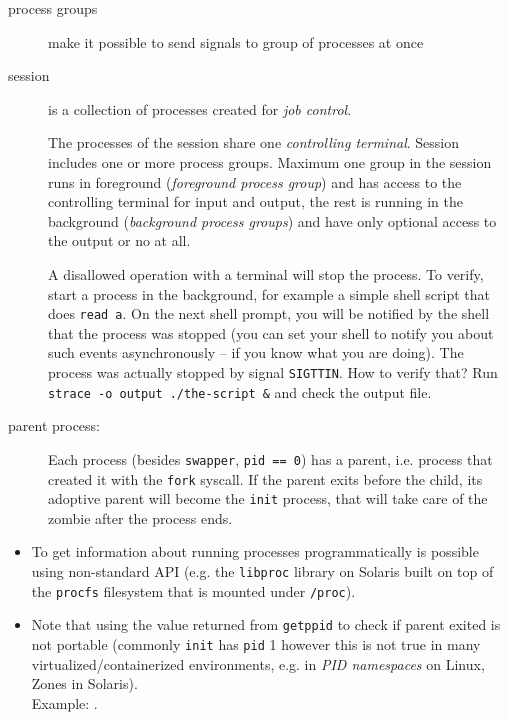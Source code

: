 \begin{description}
\item[process groups] make it possible to send signals to group of processes
at once
\item[session] is a collection of processes created for \emph{job control}.

The processes of the session share one \emph{controlling terminal}.
Session includes one or more process groups. Maximum one group in the session
runs in foreground (\emph{foreground process group}) and has access to the
controlling terminal for input and output, the rest is running in the background
(\emph{background process groups}) and have only optional access to the output
or no at all.

A disallowed operation with a terminal will stop the process.  To verify, start
a process in the background, for example a simple shell script that does
\texttt{read a}.  On the next shell prompt, you will be notified by the shell
that the process was stopped (you can set your shell to notify you about such
events asynchronously -- if you know what you are doing).  The process was
actually stopped by signal \texttt{SIGTTIN}.  How to verify that?  Run
\texttt{strace -o output ./the-script \&} and check the output file.

\item[parent process:] Each process (besides \texttt{swapper},
\texttt{pid~==~0})
has a parent, i.e. process that created it with the \texttt{fork} syscall.
If the parent exits before the child, its adoptive parent will become the
\texttt{init} process, that will take care of the zombie after the process ends.
\end{description}
\begin{itemize}
\item To get information about running processes programmatically is possible
using non-standard API (e.g. the \texttt{libproc} library on Solaris built
on top of the \texttt{procfs} filesystem that is mounted under \texttt{/proc}).
\item Note that using the value returned from \texttt{getppid} to check if
parent exited is not portable (commonly \texttt{init} has \texttt{pid} 1 however
this is not true in many virtualized/containerized environments, e.g. in
\emph{PID namespaces} on Linux, Zones in Solaris).\\
Example: .
\end{itemize}




